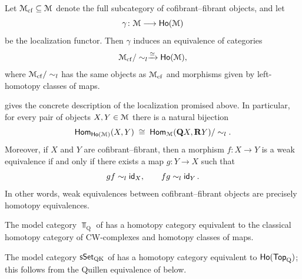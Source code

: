 \begin{cor}
  \label{ch2:: cor: fundamental theorem model categories}
  Let $\mathcal M_{\mathrm{cf}} \subseteq \mathcal M$ denote the full subcategory of
  cofibrant–fibrant objects, and let
  \begin{equation}
    \gamma \colon \mathcal M \longrightarrow \operatorname{\sf Ho}(\mathcal M)
  \end{equation}
  be the localization functor.  Then $\gamma$ induces an equivalence of
  categories
  \begin{equation}
    \mathcal M_{\mathrm{cf}}/\sim_l \xrightarrow{\simeq} \operatorname{\sf Ho}(\mathcal M),
  \end{equation}
  where $\mathcal M_{\mathrm{cf}}/\sim_l$ has the same objects as
  $\mathcal M_{\mathrm{cf}}$ and morphisms given by left-homotopy classes of maps.
\end{cor}

\begin{remark}
   gives the concrete
  description of the localization promised above.  In particular, for every
  pair of objects $X,Y\in \mathcal M$ there is a natural bijection
  \begin{equation}
    \operatorname{\sf Hom}_{\operatorname{\sf Ho}(\mathcal M)}(X,Y)
    \;\cong\;
    \operatorname{\sf Hom}_{\mathcal M}(\mathbf Q X,\mathbf R Y)/\sim_l.
  \end{equation}
  Moreover, if $X$ and $Y$ are cofibrant–fibrant, then a morphism
  $f\colon X \to Y$ is a weak equivalence if and only if there exists a map
  $g\colon Y \to X$ such that
  \begin{equation}
    g f \sim_l \operatorname{\sf id}_X,
    \qquad
    f g \sim_l \operatorname{\sf id}_Y.
  \end{equation}
  In other words, weak equivalences between cofibrant–fibrant objects are
  precisely homotopy equivalences.
\end{remark}

\begin{example}
  The model category $\Top_{\mathrm Q}$ of
   has a homotopy category equivalent
  to the classical homotopy category of CW-complexes and homotopy classes of
  maps.
\end{example}

\begin{example}
  The model category $\operatorname{\sf sSet}_{\mathrm{QK}}$ of
   has a homotopy category equivalent to
  $\operatorname{\sf Ho}(\operatorname{\mathsf{Top}}_{\mathrm Q})$; this follows from the Quillen equivalence of
   below.
\end{example}


